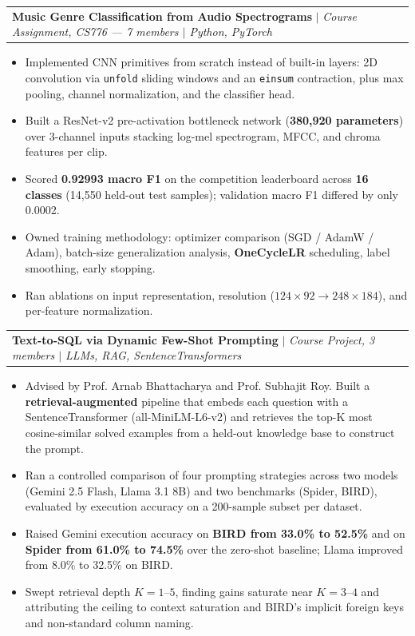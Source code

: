 \documentclass[letterpaper,11pt]{article}
\makeatletter
\newcommand{\resumeItem}[1]{
  \item\small{
    {#1 \vspace{-2pt}}
  }
}
\newcommand{\resumeProjectHeading}[2]{
    \item
    \begin{tabular*}{0.97\textwidth}{l@{\extracolsep{\fill}}r}
      \small#1 & #2 \\
    \end{tabular*}\vspace{-7pt}
}
\newcommand{\resumeItemListStart}{\begin{itemize}[label={\textbullet}]}
\newcommand{\resumeItemListEnd}{\end{itemize}\vspace{-5pt}}
\makeatother
\begin{document}
      \resumeProjectHeading
          {\textbf{Music Genre Classification from Audio Spectrograms} $\vert$ \emph{Course Assignment, CS776 --- 7 members $\vert$ Python, PyTorch}}{}
          \resumeItemListStart
            \resumeItem{Implemented CNN primitives from scratch instead of built-in layers: 2D convolution via \texttt{unfold} sliding windows and an \texttt{einsum} contraction, plus max pooling, channel normalization, and the classifier head.}
            \resumeItem{Built a ResNet-v2 pre-activation bottleneck network (\textbf{380,920 parameters}) over 3-channel inputs stacking log-mel spectrogram, MFCC, and chroma features per clip.}
            \resumeItem{Scored \textbf{0.92993 macro F1} on the competition leaderboard across \textbf{16 classes} (14,550 held-out test samples); validation macro F1 differed by only 0.0002.}
            \resumeItem{Owned training methodology: optimizer comparison (SGD / AdamW / Adam), batch-size generalization analysis, \textbf{OneCycleLR} scheduling, label smoothing, early stopping.}
            \resumeItem{Ran ablations on input representation, resolution ($124{\times}92 \rightarrow 248{\times}184$), and per-feature normalization.}
          \resumeItemListEnd

      \resumeProjectHeading
          {\textbf{Text-to-SQL via Dynamic Few-Shot Prompting} $\vert$ \emph{Course Project, 3 members $\vert$ LLMs, RAG, SentenceTransformers}}{}
          \resumeItemListStart
            \resumeItem{Advised by Prof. Arnab Bhattacharya and Prof. Subhajit Roy. Built a \textbf{retrieval-augmented} pipeline that embeds each question with a SentenceTransformer (all-MiniLM-L6-v2) and retrieves the top-K most cosine-similar solved examples from a held-out knowledge base to construct the prompt.}
            \resumeItem{Ran a controlled comparison of four prompting strategies across two models (Gemini 2.5 Flash, Llama 3.1 8B) and two benchmarks (Spider, BIRD), evaluated by execution accuracy on a 200-sample subset per dataset.}
            \resumeItem{Raised Gemini execution accuracy on \textbf{BIRD from 33.0\% to 52.5\%} and on \textbf{Spider from 61.0\% to 74.5\%} over the zero-shot baseline; Llama improved from 8.0\% to 32.5\% on BIRD.}
            \resumeItem{Swept retrieval depth $K = 1$--$5$, finding gains saturate near $K = 3$--$4$ and attributing the ceiling to context saturation and BIRD's implicit foreign keys and non-standard column naming.}
          \resumeItemListEnd
\end{document}

